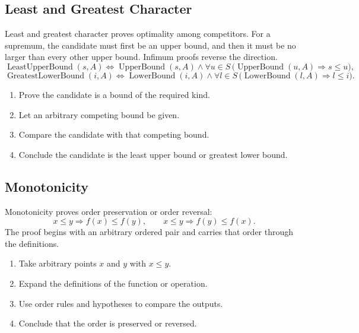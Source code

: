 \subsection*{Least and Greatest Character}
\label{subsec:property-least-greatest-character}

Least and greatest character proves optimality among competitors. For a
supremum, the candidate must first be an upper bound, and then it must be no
larger than every other upper bound. Infimum proofs reverse the direction.
\[
  \operatorname{LeastUpperBound}(s,A)
  \Longleftrightarrow
  \operatorname{UpperBound}(s,A)
  \land
  \forall u\in S\,
  \bigl(\operatorname{UpperBound}(u,A)\Longrightarrow s\leq u\bigr),
\]
\[
  \operatorname{GreatestLowerBound}(i,A)
  \Longleftrightarrow
  \operatorname{LowerBound}(i,A)
  \land
  \forall l\in S\,
  \bigl(\operatorname{LowerBound}(l,A)\Longrightarrow l\leq i\bigr).
\]

\begin{remark}
\begin{enumerate}
  \item Prove the candidate is a bound of the required kind.
  \item Let an arbitrary competing bound be given.
  \item Compare the candidate with that competing bound.
  \item Conclude the candidate is the least upper bound or greatest lower
        bound.
\end{enumerate}
\end{remark}

\subsection*{Monotonicity}
\label{subsec:property-monotonicity}

Monotonicity proves order preservation or order reversal:
\[
  x\leq y \Longrightarrow f(x)\leq f(y),
  \qquad
  x\leq y \Longrightarrow f(y)\leq f(x).
\]
The proof begins with an arbitrary ordered pair and carries that order through
the definitions.

\begin{remark}
\begin{enumerate}
  \item Take arbitrary points $x$ and $y$ with $x\leq y$.
  \item Expand the definitions of the function or operation.
  \item Use order rules and hypotheses to compare the outputs.
  \item Conclude that the order is preserved or reversed.
\end{enumerate}
\end{remark}

